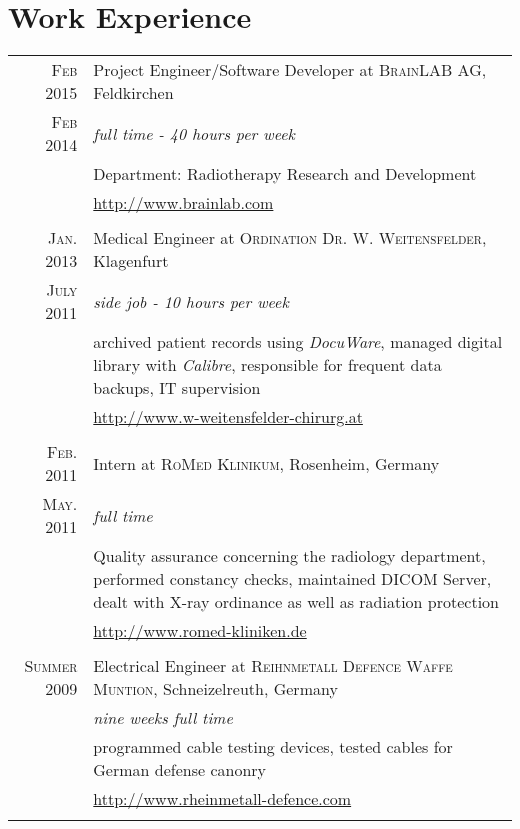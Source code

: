 \documentclass[a4paper,10pt]{article}
\begin{document}
\section{Work Experience}
\begin{longtable}{r|p{11cm}}

\textsc{Feb 2015} & Project Engineer/Software Developer at \textsc{BrainLAB AG}, Feldkirchen \\
\textsc{Feb 2014} & \emph{full time - 40 hours per week}\\
& \footnotesize{Department: Radiotherapy Research and Development }\\
& \href{http://www.brainlab.com}{http://www.brainlab.com}\\
\multicolumn{2}{c}{} \\

\textsc{Jan. 2013} & Medical Engineer at \textsc{Ordination Dr. W. Weitensfelder}, Klagenfurt \\
\textsc{July 2011} & \emph{side job - 10 hours per week}\\
& \footnotesize{archived patient records using \emph{DocuWare}, managed digital library with \emph{Calibre}, responsible for frequent data backups, IT supervision  }\\
& \href{http://www.w-weitensfelder-chirurg.at}{http://www.w-weitensfelder-chirurg.at}\\
\multicolumn{2}{c}{} \\

\textsc{Feb. 2011} & Intern at \textsc{RoMed Klinikum}, Rosenheim, Germany \emph{}\\
\textsc{May. 2011} & \emph{full time}\\
&\footnotesize{Quality assurance concerning the radiology department, performed constancy checks, maintained DICOM Server, dealt with X-ray ordinance as well as radiation protection}\\
& \href{http://www.romed-kliniken.de}{http://www.romed-kliniken.de}\\
\multicolumn{2}{c}{} \\

\textsc{Summer 2009} & Electrical Engineer at \textsc{Reihnmetall Defence Waffe Muntion}, Schneizelreuth, Germany\\
&\emph{nine weeks full time}\\
& \footnotesize{programmed cable testing devices, tested cables for German defense canonry}\\
& \href{http://www.rheinmetall-defence.com}{http://www.rheinmetall-defence.com}\\
\multicolumn{2}{c}{} \\


\end{longtable}
\end{document}

